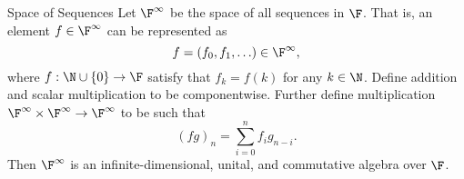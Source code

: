 \documentclass[linearalgebraII]{subfiles}
\begin{document}
    \begin{prop}{Space of Sequences}
        Let $\F^\infty$ be the space of all sequences in $\F$. That is, an element $f\in \F^\infty$ can be represented as
        \begin{equation*}
            f = \left( f_0, f_1, \ldots \right) \in \F^\infty, 
        \end{equation*}
        where $f: \N\cup \left\lbrace 0 \right\rbrace \to \F$ satisfy that $f_k = f(k)$ for any $k\in \N$. Define addition and scalar multiplication to be componentwise. Further define multiplication $\F^\infty\times\F^\infty\to\F^\infty$ to be such that
        \begin{equation*}
            \left( fg \right)_n = \sum^n_{i=0} f_ig_{n-i}.
        \end{equation*}
        Then $\F^\infty$ is an infinite-dimensional, unital, and commutative algebra over $\F$.
    \end{prop}
\end{document}
